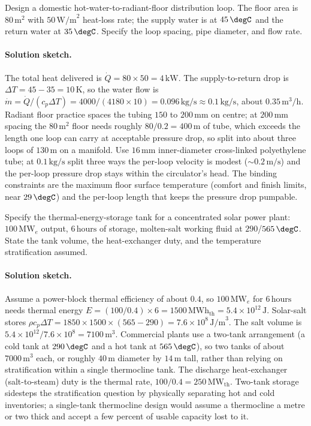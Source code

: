 \begin{exercise}
Design a domestic hot-water-to-radiant-floor distribution loop. The
floor area is $80\,\text{m}^2$ with $50\,\text{W/m}^2$ heat-loss
rate; the supply water is at $45\,\degC$ and the return water at
$35\,\degC$. Specify the loop spacing, pipe diameter, and flow rate.

\paragraph{Solution sketch.} The total heat delivered is $\dot{Q} = 80
\times 50 = 4\,\text{kW}$. The supply-to-return drop is $\Delta T =
45 - 35 = 10\,\si{\kelvin}$, so the water flow is $\dot{m} = \dot{Q}/
(c_p \Delta T) = 4000/(4180 \times 10) = 0.096\,\text{kg/s} \approx
0.1\,\text{kg/s}$, about $0.35\,\text{m}^3/\text{h}$. Radiant floor
practice spaces the tubing $150$ to $200\,\si{\milli\meter}$ on centre;
at $200\,\si{\milli\meter}$ spacing the $80\,\text{m}^2$ floor needs
roughly $80/0.2 = 400\,\text{m}$ of tube, which exceeds the length one
loop can carry at acceptable pressure drop, so split into about three
loops of $130\,\text{m}$ on a manifold. Use $16\,\si{\milli\meter}$
inner-diameter cross-linked polyethylene tube; at $0.1\,\text{kg/s}$
split three ways the per-loop velocity is modest ($\sim 0.2\,\text{m/s}$)
and the per-loop pressure drop stays within the circulator's head. The
binding constraints are the maximum floor surface temperature (comfort
and finish limits, near $29\,\degC$) and the per-loop length that keeps
the pressure drop pumpable.
\end{exercise}

\begin{exercise}
Specify the thermal-energy-storage tank for a concentrated solar
power plant: $100\,\text{MW}_e$ output, $6\,\text{hours}$ of storage,
molten-salt working fluid at $290$/$565\,\degC$. State the tank
volume, the heat-exchanger duty, and the temperature stratification
assumed.

\paragraph{Solution sketch.} Assume a power-block thermal efficiency of
about $0.4$, so $100\,\text{MW}_e$ for $6\,\text{hours}$ needs thermal
energy $E = (100/0.4) \times 6 = 1500\,\text{MWh}_{\text{th}} = 5.4
\times 10^{12}\,\text{J}$. Solar-salt stores $\rho c_p \Delta T = 1850
\times 1500 \times (565 - 290) = 7.6 \times 10^{8}\,\text{J/m}^3$. The
salt volume is $5.4 \times 10^{12}/7.6 \times 10^{8} = 7100\,\text{m}^3$.
Commercial plants use a two-tank arrangement (a cold tank at $290\,
\degC$ and a hot tank at $565\,\degC$), so two tanks of about $7000\,
\text{m}^3$ each, or roughly $40\,\text{m}$ diameter by $14\,\text{m}$
tall, rather than relying on stratification within a single
thermocline tank. The discharge heat-exchanger (salt-to-steam) duty is
the thermal rate, $100/0.4 = 250\,\text{MW}_{\text{th}}$. Two-tank
storage sidesteps the stratification question by physically separating
hot and cold inventories; a single-tank thermocline design would assume
a thermocline a metre or two thick and accept a few percent of usable
capacity lost to it.
\end{exercise}

